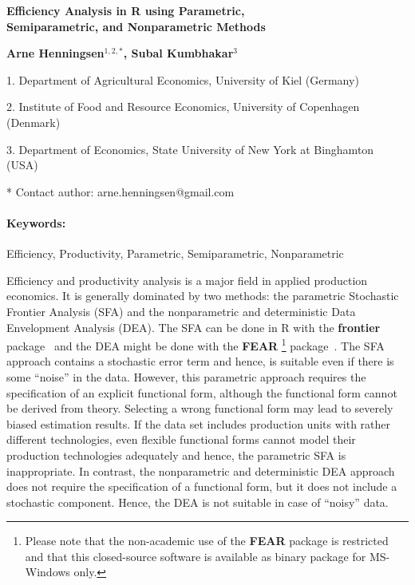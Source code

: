 \documentclass[10pt]{article}
\renewcommand{\title}[1]{\begin{center}{\bf \LARGE #1}\end{center}}
\newcommand{\keywords}{\paragraph{Keywords:}}
\begin{document}
\pagestyle{empty}

\title{Efficiency Analysis in \textsf{R} using Parametric,\\[3mm]
Semiparametric, and Nonparametric Methods}

\begin{center}
  {\bf Arne Henningsen$^{1,2,*}$, Subal Kumbhakar$^{3}$}
\end{center}

\begin{affiliations}
1. Department of Agricultural Economics, University of Kiel (Germany)\par
2. Institute of Food and Resource Economics, University of Copenhagen (Denmark)\par
3. Department of Economics, State University of New York at Binghamton (USA)\par
* Contact author: arne.henningsen@gmail.com
\end{affiliations}

\keywords Efficiency, Productivity, Parametric, Semiparametric, Nonparametric

\vskip 0.8cm

Efficiency and productivity analysis is a major field
in applied production economics.
It is generally dominated by two methods:
the parametric Stochastic Frontier Analysis (SFA) and
the nonparametric and deterministic Data Envelopment Analysis (DEA).
The SFA can be done in \textsf{R} with the \textbf{frontier}
package~\cite{r-frontier-0.9}
and the DEA might be done with the \textbf{FEAR}%
\footnote{%
Please note that the non-academic use of the \textbf{FEAR} package
is restricted and that this closed-source software
is available as binary package for MS-Windows only.%
}
package~\cite{wilson08}.
The SFA approach contains a stochastic error term and hence,
is suitable even if there is some ``noise'' in the data.
However, this parametric approach requires the specification
of an explicit functional form,
although the functional form cannot be derived from theory.
Selecting a wrong functional form may lead to severely biased
estimation results.
If the data set includes production units
with rather different technologies,
even flexible functional forms
cannot model their production technologies adequately
and hence, the parametric SFA is inappropriate.
In contrast, the nonparametric and deterministic DEA approach does not require
the specification of a functional form,
but it does not include a stochastic component.
Hence, the DEA is not suitable in case of ``noisy'' data.
\end{document}

